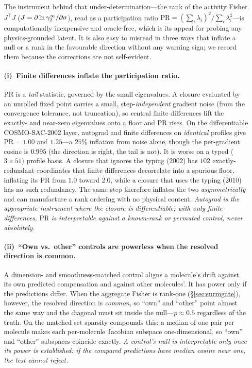 The instrument behind that under-determination---the rank of the activity Fisher $J^{\top}J$
($J=\partial\ln\gamma_2^\infty/\partial\sigma$), read as a participation ratio
$\mathrm{PR}=(\sum_i\lambda_i)^2/\sum_i\lambda_i^2$---is computationally inexpensive and oracle-free, which
is its appeal for probing any physics-grounded latent. It is also easy to misread in three ways that
inflate a null or a rank in the favourable direction without any warning sign; we record them
because the corrections are not self-evident.

\paragraph{(i)~Finite differences inflate the participation ratio.} $\mathrm{PR}$ is a \emph{tail} statistic,
governed by the small eigenvalues. A closure evaluated by an unrolled fixed point carries a small,
step-\emph{independent} gradient noise (from the convergence tolerance, not truncation), so central finite
differences lift the exactly- and near-zero eigenvalues onto a floor and $\mathrm{PR}$ rises. On the
differentiable COSMO-SAC-2002 layer, autograd and finite differences on \emph{identical} profiles give
$\mathrm{PR}=1.00$ and $1.25$---a $25\%$ inflation from noise alone, though the per-gradient cosine is $0.995$
(the direction is right, the tail is not). It is worse on a typed ($3\times51$) profile basis. A closure that
ignores the typing (2002) has $102$ exactly-redundant coordinates that finite differences decorrelate into a
spurious floor, inflating its $\mathrm{PR}$ from $1.0$ toward $2.0$, while a closure that uses the typing
(2010) has no such redundancy. The same step therefore inflates the two \emph{asymmetrically} and can
manufacture a rank ordering with no physical content. \emph{Autograd is the appropriate instrument where the closure is
differentiable; with only finite differences, $\mathrm{PR}$ is interpretable against a known-rank or
permuted control, never absolutely.}

\paragraph{(ii)~``Own vs.\ other'' controls are powerless when the resolved direction is common.} A
dimension- and smoothness-matched control aligns a molecule's drift against its own predicted compensation and
against other molecules'. It has power only if the predictions differ. When the aggregate Fisher is
rank-one (\S\ref{sec:surrogate}), however, the resolved direction is \emph{common}, so ``own'' and ``other'' point
almost the same way and the diagonal must sit inside the null---$p\approx0.5$ regardless of the truth. On the
matched set sparsity compounds this: a median of one pair per molecule makes each per-molecule Jacobian
subspace one-dimensional, so ``own'' and ``other'' subspaces coincide exactly. \emph{A control's null is
interpretable only once its power is established: if the compared predictions have median cosine near one,
the test cannot reject.}

